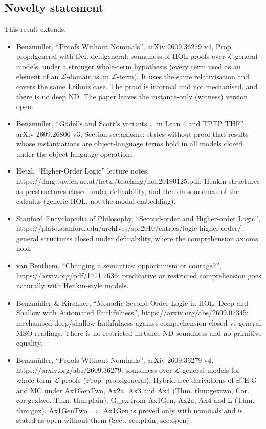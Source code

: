 \documentclass{article}
\begin{document}
\subsection*{Novelty statement}

This result extends:

\begin{itemize}
\item Benzmüller, ``Proofs Without Nominals'', arXiv 2609.36279 v4, Prop. prop:lgeneral with Def. def:lgeneral: soundness of HOL proofs over $\mathcal{L}$-general models, under a stronger whole-term hypothesis (every term used as an element of an $\mathcal{L}$-domain is an $\mathcal{L}$-term). It uses the same relativisation and covers the same Leibniz case. The proof is informal and not mechanised, and there is no deep ND. The paper leaves the instance-only (witness) version open.
\item Benzmüller, ``Gödel's and Scott's variants \ldots{} in Lean 4 and TPTP THF'', arXiv 2609.26806 v3, Section sec:axioms: states without proof that results whose instantiations are object-language terms hold in all models closed under the object-language operations.
\item Hetzl, ``Higher-Order Logic'' lecture notes, https://dmg.tuwien.ac.at/hetzl/teaching/hol.20190125.pdf: Henkin structures as prestructures closed under definability, and Henkin soundness of the calculus (generic HOL, not the modal embedding).
\item Stanford Encyclopedia of Philosophy, ``Second-order and Higher-order Logic'', https://plato.stanford.edu/archIves/spr2010/entries/logic-higher-order/: general structures closed under definability, where the comprehension axioms hold.
\item van Benthem, ``Changing a semantics: opportunism or courage?'', https://arxiv.org/pdf/1411.7636: predicative or restricted comprehension goes naturally with Henkin-style models.
\item Benzmüller \& Kirchner, ``Monadic Second-Order Logic in HOL: Deep and Shallow with Automated Faithfulness'', https://arxiv.org/abs/2609.07345: mechanised deep/shallow faithfulness against comprehension-closed vs general MSO readings. There is no restricted-instance ND soundness and no primitive equality.
\item Benzmüller, ``Proofs Without Nominals'', arXiv 2609.36279 v4, https://arxiv.org/abs/2609.36279: soundness over $\mathcal{L}$-general models for whole-term $\mathcal{L}$-proofs (Prop. prop:lgeneral). Hybrid-free derivations of $\exists$\textasciicircum{}E G and MC under Ax1GenTwo, Ax2a, Ax3 and Ax4 (Thm. thm:gextwo, Cor. cor:gextwo, Thm. thm:plain). G\_ex from Ax1Gen, Ax2a, Ax4 and L (Thm. thm:gex). Ax1GenTwo $\Rightarrow$ Ax1Gen is proved only with nominals and is stated as open without them (Sect. sec:plain, sec:open).

\end{itemize}
\end{document}
